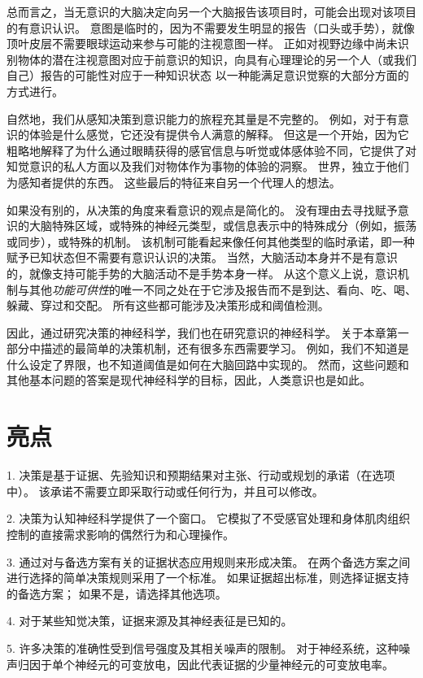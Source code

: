 总而言之，当无意识的大脑决定向另一个大脑报告该项目时，可能会出现对该项目的有意识认识。
意图是临时的，因为不需要发生明显的报告（口头或手势），就像顶叶皮层不需要眼球运动来参与可能的注视意图一样。
正如对视野边缘中尚未识别物体的潜在注视意图对应于前意识的知识，向具有心理理论的另一个人（或我们自己）报告的可能性对应于一种知识状态 以一种能满足意识觉察的大部分方面的方式进行。


自然地，我们从感知决策到意识能力的旅程充其量是不完整的。
例如，对于有意识的体验是什么感觉，它还没有提供令人满意的解释。
但这是一个开始，因为它粗略地解释了为什么通过眼睛获得的感官信息与听觉或体感体验不同，它提供了对知觉意识的私人方面以及我们对物体作为事物的体验的洞察。
世界，独立于他们为感知者提供的东西。
这些最后的特征来自另一个代理人的想法。


如果没有别的，从决策的角度来看意识的观点是简化的。
没有理由去寻找赋予意识的大脑特殊区域，或特殊的神经元类型，或信息表示中的特殊成分（例如，振荡或同步），或特殊的机制。
该机制可能看起来像任何其他类型的临时承诺，即一种赋予已知状态但不需要有意识认识的决策。
当然，大脑活动本身并不是有意识的，就像支持可能手势的大脑活动不是手势本身一样。
从这个意义上说，意识机制与其他\textit{功能可供性}的唯一不同之处在于它涉及报告而不是到达、看向、吃、喝、躲藏、穿过和交配。
所有这些都可能涉及决策形成和阈值检测。


因此，通过研究决策的神经科学，我们也在研究意识的神经科学。
关于本章第一部分中描述的最简单的决策机制，还有很多东西需要学习。
例如，我们不知道是什么设定了界限，也不知道阈值是如何在大脑回路中实现的。
然而，这些问题和其他基本问题的答案是现代神经科学的目标，因此，人类意识也是如此。



\section{亮点}

1. 决策是基于证据、先验知识和预期结果对主张、行动或规划的承诺（在选项中）。
该承诺不需要立即采取行动或任何行为，并且可以修改。 


2. 决策为认知神经科学提供了一个窗口。
它模拟了不受感官处理和身体肌肉组织控制的直接需求影响的偶然行为和心理操作。


3. 通过对与备选方案有关的证据状态应用规则来形成决策。
在两个备选方案之间进行选择的简单决策规则采用了一个标准。
如果证据超出标准，则选择证据支持的备选方案；
如果不是，请选择其他选项。


4. 对于某些知觉决策，证据来源及其神经表征是已知的。


5. 许多决策的准确性受到信号强度及其相关噪声的限制。
对于神经系统，这种噪声归因于单个神经元的可变放电，因此代表证据的少量神经元的可变放电率。


